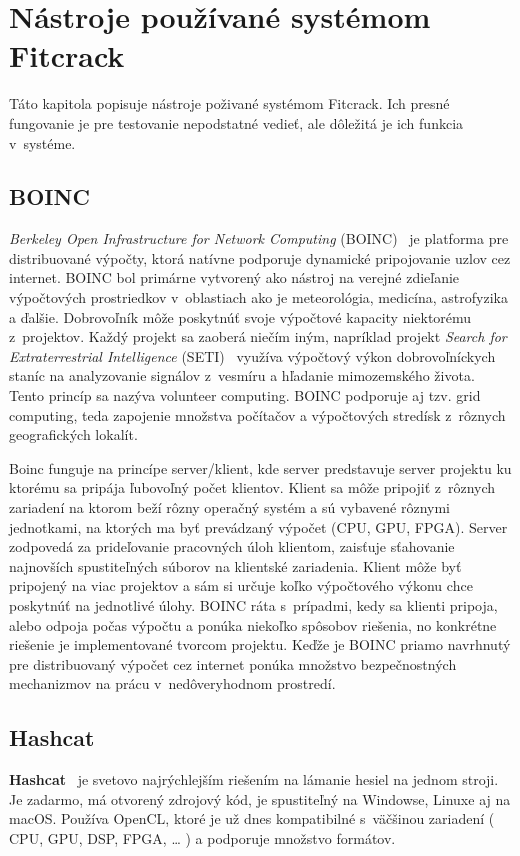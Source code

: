 \section{Nástroje používané systémom Fitcrack}
Táto kapitola popisuje nástroje poživané systémom Fitcrack.
Ich presné fungovanie je pre testovanie nepodstatné vedieť, ale dôležitá je ich funkcia v~systéme.

\subsection{BOINC}
\label{boinc}
\textit{Berkeley Open Infrastructure for Network Computing} (BOINC)~\cite{boincintro} je platforma pre distribuované výpočty, ktorá natívne podporuje dynamické pripojovanie uzlov cez internet.
BOINC bol primárne vytvorený ako nástroj na verejné zdieľanie výpočtových  prostriedkov v~oblastiach ako je meteorológia, medicína, astrofyzika a ďalšie.
Dobrovoľník môže poskytnúť svoje výpočtové kapacity niektorému z~projektov.
Každý projekt sa zaoberá niečím iným, napríklad projekt \textit{Search for Extraterrestrial Intelligence} (SETI)~\cite{SETI} využíva výpočtový výkon dobrovoľníckych staníc na analyzovanie signálov z~vesmíru a hľadanie mimozemského života.
Tento princíp sa nazýva volunteer computing.
BOINC podporuje aj tzv.
grid computing, teda zapojenie množstva počítačov a výpočtových stredísk z~rôznych geografických lokalít.

Boinc funguje na princípe server/klient, kde server predstavuje server projektu ku ktorému sa pripája ľubovoľný počet klientov.
Klient sa môže pripojiť z~rôznych zariadení na ktorom beží rôzny operačný systém a sú vybavené rôznymi jednotkami, na ktorých ma byť prevádzaný výpočet (CPU, GPU, FPGA).
Server zodpovedá za prideľovanie pracovných úloh klientom, zaisťuje sťahovanie najnovších spustiteľných súborov na klientské zariadenia.
Klient môže byť pripojený na viac projektov a sám si určuje koľko výpočtového výkonu chce poskytnúť na jednotlivé úlohy.
BOINC ráta s~prípadmi, kedy sa klienti pripoja, alebo odpoja počas výpočtu a ponúka niekoľko spôsobov riešenia, no konkrétne riešenie je implementované tvorcom projektu.
Keďže je BOINC priamo navrhnutý pre distribuovaný výpočet cez internet ponúka množstvo bezpečnostných mechanizmov na prácu v~nedôveryhodnom prostredí.

\subsection{Hashcat}
\label{hashcat}
\textbf{Hashcat}~\cite{hashcatnet} je svetovo najrýchlejším riešením na lámanie hesiel na jednom stroji.
Je zadarmo, má otvorený zdrojový kód, je spustiteľný na Windowse, Linuxe aj na macOS.
Používa OpenCL, ktoré je už dnes kompatibilné s~väčšinou zariadení ( CPU, GPU, DSP, FPGA, … ) a podporuje množstvo formátov.

